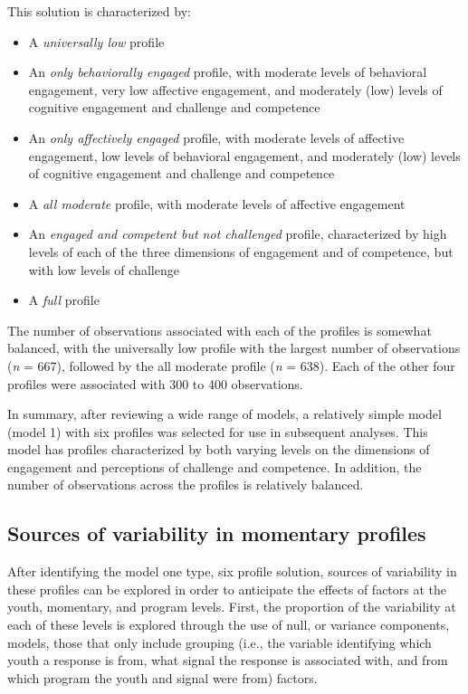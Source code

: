 \documentclass[]{msu-thesis}
\providecommand{\tightlist}{%
  \setlength{\itemsep}{0pt}\setlength{\parskip}{0pt}}
\theoremstyle{definition}
\theoremstyle{definition}
\theoremstyle{definition}
\theoremstyle{remark}
\begin{document}
This solution is characterized by:

\begin{itemize}
\tightlist
\item
  A \emph{universally low} profile
\item
  An \emph{only behaviorally engaged} profile, with moderate levels of
  behavioral engagement, very low affective engagement, and moderately
  (low) levels of cognitive engagement and challenge and competence
\item
  An \emph{only affectively engaged} profile, with moderate levels of
  affective engagement, low levels of behavioral engagement, and
  moderately (low) levels of cognitive engagement and challenge and
  competence
\item
  A \emph{all moderate} profile, with moderate levels of affective
  engagement
\item
  An \emph{engaged and competent but not challenged} profile,
  characterized by high levels of each of the three dimensions of
  engagement and of competence, but with low levels of challenge
\item
  A \emph{full} profile
\end{itemize}

The number of observations associated with each of the profiles is
somewhat balanced, with the universally low profile with the largest
number of observations (\emph{n} = 667), followed by the all moderate
profile (\emph{n} = 638). Each of the other four profiles were
associated with 300 to 400 observations.

In summary, after reviewing a wide range of models, a relatively simple
model (model 1) with six profiles was selected for use in subsequent
analyses. This model has profiles characterized by both varying levels
on the dimensions of engagement and perceptions of challenge and
competence. In addition, the number of observations across the profiles
is relatively balanced.

\subsection{Sources of variability in momentary
profiles}\label{sources-of-variability-in-momentary-profiles}

After identifying the model one type, six profile solution, sources of
variability in these profiles can be explored in order to anticipate the
effects of factors at the youth, momentary, and program levels. First,
the proportion of the variability at each of these levels is explored
through the use of null, or variance components, models, those that only
include grouping (i.e., the variable identifying which youth a response
is from, what signal the response is associated with, and from which
program the youth and signal were from) factors.
\end{document}
